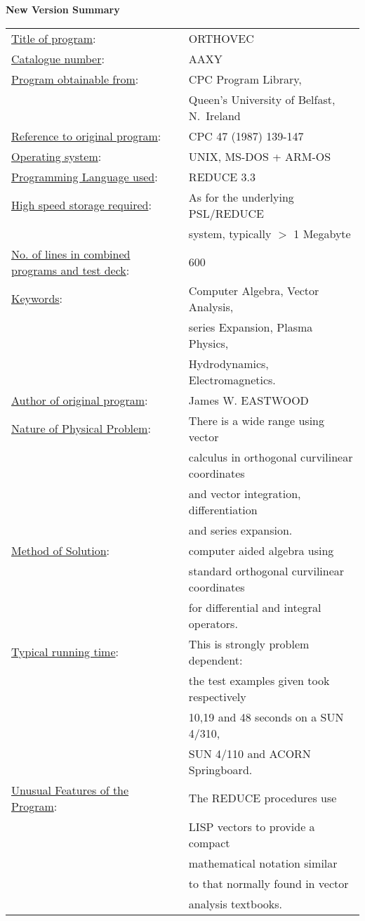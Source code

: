\newpage
\begin{center}
{\Large{\bf New Version Summary}}
\end{center}
\begin{tabular}{ll}
\underline{Title of program}:&ORTHOVEC\\[2ex]
\underline{Catalogue number}:&AAXY\\[2ex]
\underline{Program obtainable from}: &CPC Program Library,\\
&Queen's University of Belfast, N.~Ireland\\[2ex]
\underline{Reference to original program}: &CPC 47 (1987) 139-147\\[2ex]
\underline{Operating system}:&UNIX, MS-DOS + ARM-OS\\[2ex]
\underline{Programming Language used}: &REDUCE 3.3\\[2ex]
\underline{High speed storage required}: &As for 
the underlying PSL/REDUCE \\
&system, typically $>$ 1 Megabyte\\[2ex]
\underline{No. of lines in combined programs and test deck}:&600 \\[2ex]
\underline{Keywords}: & Computer Algebra, Vector Analysis,\\
& series Expansion,  Plasma Physics, \\
&Hydrodynamics, Electromagnetics.\\[2ex]
\underline{Author of original program}: &James W. EASTWOOD\\[2ex]
\underline{Nature of Physical Problem}: 
&There is a wide range using vector\\
& calculus in orthogonal curvilinear coordinates\\
& and vector integration, differentiation\\
& and series expansion.\\[2ex]
\underline{Method of Solution}: & computer aided algebra using\\
&standard orthogonal curvilinear coordinates\\
&for differential and integral operators.\\[2ex]
\underline{Typical running time}: 
& This is strongly problem dependent:\\
&the test examples given took respectively\\
& 10,19 and 48 seconds on a SUN 4/310,\\
&SUN 4/110 and ACORN Springboard. \\[2ex]
\underline{Unusual Features of the Program}: 
&The REDUCE procedures use\\
&LISP vectors \cite{r2}
to provide a compact\\
&mathematical notation similar\\
& to that normally found in vector\\
& analysis textbooks.\\
\end{tabular}

